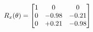 \documentclass[preview]{standalone}
\begin{document}
\begin{align*}
\special{dvisvgm:raw <g id='unique000'>}R_{x}(\theta) = \begin{bmatrix}1 & 0 & 0 \\0 & -0.98 & -0.21 \\0 & +0.21 & -0.98\end{bmatrix}\special{dvisvgm:raw </g>}
\end{align*}
\end{document}

